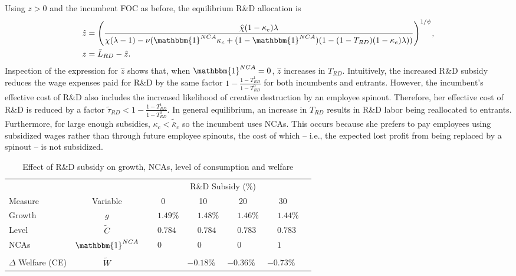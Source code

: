 \documentclass[11pt,english]{article}
\theoremstyle{definition}
\begin{document}
Using $z > 0$ and the incumbent FOC as before, the equilibrium R\&D allocation is
\begin{align}
	\hat{z} &= \Bigg( \frac{\hat{\chi} (1-\kappa_{e}) \lambda}{\chi(\lambda -1) - \nu (\mathbbm{1}^{NCA}\kappa_c + (1-\mathbbm{1}^{NCA})(1 - (1-T_{RD})(1-\kappa_e)\lambda)) } \Bigg)^{1/\psi}, \label{eq:effort_entrant_RDsubsidy} \\
	z &= \bar{L}_{RD} - \hat{z}.
\end{align}
Inspection of the expression for $\hat{z}$ shows that, when $\mathbbm{1}^{NCA} = 0$, $\hat{z}$ increases in $T_{RD}$. Intuitively, the increased R\&D subsidy reduces the wage expenses paid for R\&D by the same factor $1-\frac{1-T_{RD}^1}{1-T_{RD}^0}$ for both incumbents and entrants. However, the incumbent's effective cost of R\&D also includes the increased likelihood of creative destruction by an employee spinout. Therefore, her effective cost of R\&D is reduced by a factor $\tilde{\tau}_{RD} < 1-\frac{1-T_{RD}^1}{1-T_{RD}^0}$. In general equilibrium, an increase in $T_{RD}$ results in R\&D labor being reallocated to entrants. Furthermore, for large enough subsidies, $\kappa_c < \tilde{\bar{\kappa}}_c$ so the incumbent uses NCAs. This occurs because she prefers to pay employees using subsidized wages rather than through future employee spinouts, the cost of which -- i.e., the expected lost profit from being replaced by a spinout -- is not subsidized.

\begin{table}
	\centering
	\caption{Effect of R\&D subsidy on growth, NCAs, level of consumption and welfare}\label{rdsubsidy_table}
	\begin{tabular}{lclllll}
		\toprule \toprule
		&  & \multicolumn{4}{c}{R\&D Subsidy (\%)} \vspace{3pt} \tabularnewline
		Measure &Variable & \multicolumn{1}{c}{0} & \multicolumn{1}{c}{10} & \multicolumn{1}{c}{20} & \multicolumn{1}{c}{30} \tabularnewline
		\midrule
		Growth & $g$ & $\phantom{-}1.49\%$ & $\phantom{-}1.48\%$ & $\phantom{-}1.46\%$ & $\phantom{-}1.44\%$ \tabularnewline
		Level & $\tilde{C}$  & $\phantom{-}0.784$ &  $\phantom{-}0.784$ & $\phantom{-}0.783$ & $\phantom{-}0.783$ \tabularnewline 
		NCAs & $\mathbbm{1}^{NCA}$ & $\phantom{-}0$ & $\phantom{-}0$ & $\phantom{-}0$ & $\phantom{-}1$ \tabularnewline
		\tabularnewline
		$\Delta$ Welfare (CE) & $\tilde{W}$  &  & $- 0.18\%$ & $- 0.36\%$ & $- 0.73\%$ \tabularnewline
		\bottomrule
	\end{tabular}
\end{table}
\end{document}
